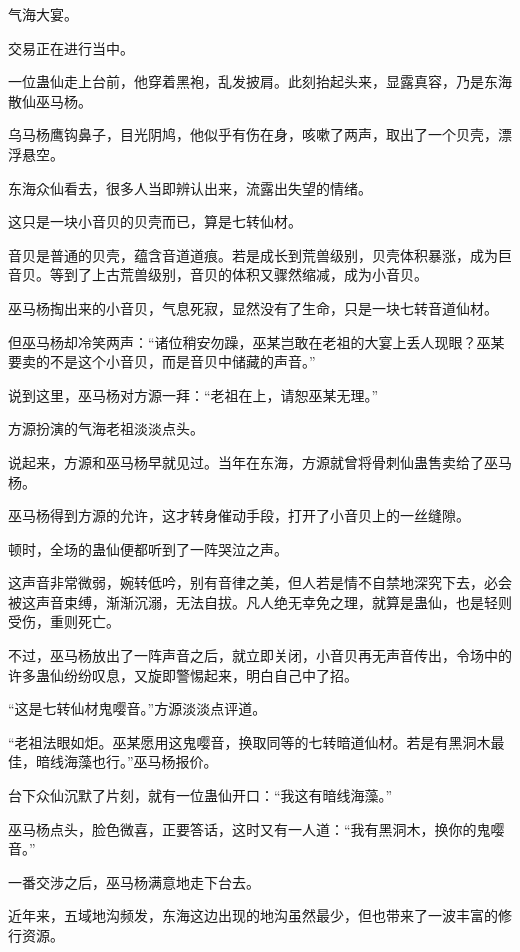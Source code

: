 
\begin{this_body}

气海大宴。

交易正在进行当中。

一位蛊仙走上台前，他穿着黑袍，乱发披肩。此刻抬起头来，显露真容，乃是东海散仙巫马杨。

乌马杨鹰钩鼻子，目光阴鸠，他似乎有伤在身，咳嗽了两声，取出了一个贝壳，漂浮悬空。

东海众仙看去，很多人当即辨认出来，流露出失望的情绪。

这只是一块小音贝的贝壳而已，算是七转仙材。

音贝是普通的贝壳，蕴含音道道痕。若是成长到荒兽级别，贝壳体积暴涨，成为巨音贝。等到了上古荒兽级别，音贝的体积又骤然缩减，成为小音贝。

巫马杨掏出来的小音贝，气息死寂，显然没有了生命，只是一块七转音道仙材。

但巫马杨却冷笑两声：“诸位稍安勿躁，巫某岂敢在老祖的大宴上丢人现眼？巫某要卖的不是这个小音贝，而是音贝中储藏的声音。”

说到这里，巫马杨对方源一拜：“老祖在上，请恕巫某无理。”

方源扮演的气海老祖淡淡点头。

说起来，方源和巫马杨早就见过。当年在东海，方源就曾将骨刺仙蛊售卖给了巫马杨。

巫马杨得到方源的允许，这才转身催动手段，打开了小音贝上的一丝缝隙。

顿时，全场的蛊仙便都听到了一阵哭泣之声。

这声音非常微弱，婉转低吟，别有音律之美，但人若是情不自禁地深究下去，必会被这声音束缚，渐渐沉溺，无法自拔。凡人绝无幸免之理，就算是蛊仙，也是轻则受伤，重则死亡。

不过，巫马杨放出了一阵声音之后，就立即关闭，小音贝再无声音传出，令场中的许多蛊仙纷纷叹息，又旋即警惕起来，明白自己中了招。

“这是七转仙材鬼嘤音。”方源淡淡点评道。

“老祖法眼如炬。巫某愿用这鬼嘤音，换取同等的七转暗道仙材。若是有黑洞木最佳，暗线海藻也行。”巫马杨报价。

台下众仙沉默了片刻，就有一位蛊仙开口：“我这有暗线海藻。”

巫马杨点头，脸色微喜，正要答话，这时又有一人道：“我有黑洞木，换你的鬼嘤音。”

一番交涉之后，巫马杨满意地走下台去。

近年来，五域地沟频发，东海这边出现的地沟虽然最少，但也带来了一波丰富的修行资源。


\end{this_body}
